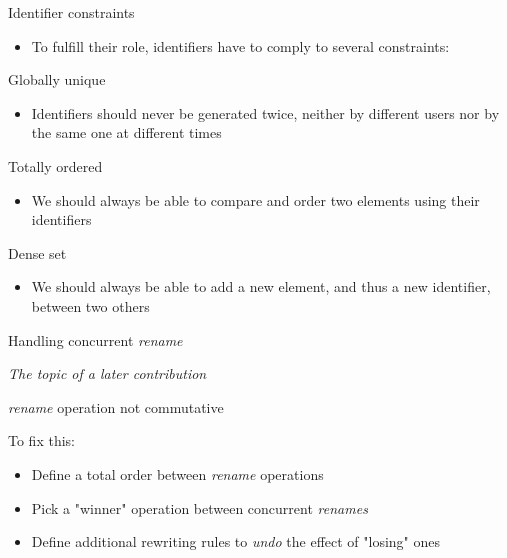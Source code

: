 \documentclass[10pt]{beamer}
\begin{document}
\begin{frame}{Identifier constraints}
  \begin{itemize}
    \item To fulfill their role, identifiers have to comply to several constraints:
  \end{itemize}

  \begin{block}{Globally unique}
    \begin{itemize}
      \item Identifiers should never be generated twice, neither by different users nor by the same one at different times
    \end{itemize}
  \end{block}
  \begin{block}{Totally ordered}
    \begin{itemize}
      \item We should always be able to compare and order two elements using their identifiers
    \end{itemize}
  \end{block}
  \begin{block}{Dense set}
    \begin{itemize}
      \item We should always be able to add a new element, and thus a new identifier, between two others
    \end{itemize}
  \end{block}
\end{frame}

\begin{frame}{Handling concurrent \emph{rename}}
  \begin{center}
    \emph{The topic of a later contribution}
  \end{center}

  \pause

  \begin{block}{\alert{\emph{rename} operation not commutative}}
  \end{block}

  \pause

  \begin{block}{To fix this:}
    \begin{itemize}
      \item Define a total order between \emph{rename} operations
      \item Pick a "winner" operation between concurrent \emph{renames}
      \item Define additional rewriting rules to \emph{undo} the effect of "losing" ones
    \end{itemize}
  \end{block}
\end{frame}
\end{document}
